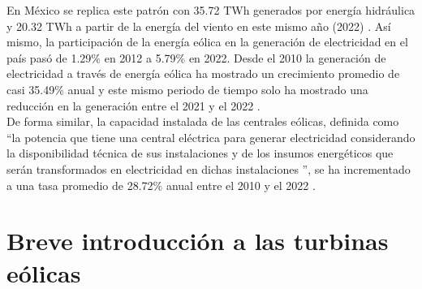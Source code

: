 \noindent En México se replica este patrón con 35.72 TWh generados por energía hidráulica y 20.32 TWh a partir de la energía del viento en este mismo año (2022) \cite{owid-renewable-energy}. Así mismo, la participación de la energía eólica en la generación de electricidad en el país pasó de 1.29\% en 2012 a 5.79\% en 2022. Desde el 2010 la generación de electricidad a través de energía eólica ha mostrado un crecimiento promedio de casi 35.49\% anual y este mismo periodo de tiempo solo ha mostrado una reducción en la generación entre el 2021 y el 2022 \cite{statistical-review}.
\\

\noindent De forma similar, la capacidad instalada de las centrales eólicas, definida como “la potencia que tiene una central eléctrica para generar electricidad considerando la disponibilidad técnica de sus instalaciones y de los insumos energéticos que serán transformados en electricidad en dichas instalaciones \cite{CONACYT2022}”, se ha incrementado a una tasa promedio de 28.72\% anual entre el 2010 y el 2022 \cite{statistical-review}.

\section{Breve introducción a las turbinas eólicas}

